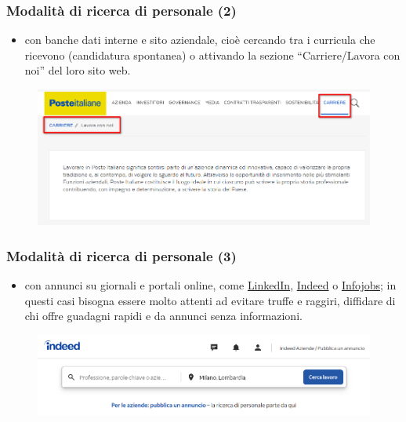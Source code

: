 \documentclass[handout]{beamer}
\begin{document}
\begin{frame}
\frametitle{Modalità di ricerca di personale (2)}
\begin{itemize}\setcounter{enumi}{1}
  \item con \alert{banche dati interne e sito aziendale}, cioè cercando tra i curricula che ricevono (\alert{candidatura spontanea}) o attivando la sezione ``Carriere/Lavora con noi'' del loro sito web.
\end{itemize}
\begin{figure}
  \includegraphics[width=.8\columnwidth]{img/lavoraconnoi.png}
\end{figure}
\end{frame}


\begin{frame}
\frametitle{Modalità di ricerca di personale (3)}
\begin{itemize}\setcounter{enumi}{1}
  \item con \alert{annunci su giornali e portali online}, come \href{https://www.linkedin.com/}{LinkedIn}, \href{https://it.indeed.com/}{Indeed} o \href{https://www.infojobs.it/}{Infojobs}; in questi casi bisogna essere molto attenti ad evitare truffe e raggiri, diffidare di chi offre guadagni rapidi e da annunci senza informazioni.
\end{itemize}
\begin{figure}
  \includegraphics[width=.8\columnwidth]{img/indeed.png}
\end{figure}
\end{frame}
\end{document}
